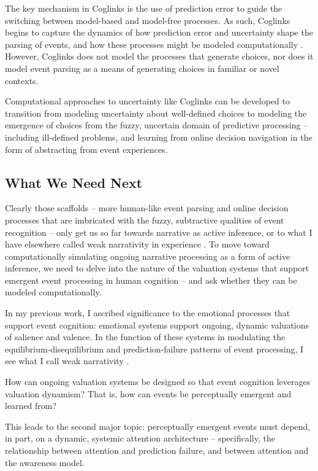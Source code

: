 \documentclass[11pt,a4paper]{article}
\begin{document}
The key mechanism in Coglinks is the use of prediction error to guide the switching between model-based and model-free processes. As such, Coglinks begins to capture the dynamics of how prediction error and uncertainty shape the parsing of events, and how these processes might be modeled computationally \citep{wang2025neural}. However, Coglinks does not model the processes that generate choices, nor does it model event parsing as a means of generating choices in familiar or novel contexts.

Computational approaches to uncertainty like Coglinks can be developed to transition from modeling uncertainty about well-defined choices to modeling the emergence of choices from the fuzzy, uncertain domain of predictive processing -- including ill-defined problems, and learning from online decision navigation in the form of abstracting from event experiences.

\subsection{What We Need Next}
Clearly those scaffolds -- more human-like event parsing and online decision processes that are imbricated with the fuzzy, subtractive qualities of event recognition -- only get us so far towards narrative as active inference, or to what I have elsewhere called weak narrativity in experience \citep{miller2023eventsweaknarrativity}. To move toward computationally simulating ongoing narrative processing as a form of active inference, we need to delve into the nature of the valuation systems that support emergent event processing in human cognition -- and ask whether they can be modeled computationally.

In my previous work, I ascribed significance to the emotional processes that support event cognition: emotional systems support ongoing, dynamic valuations of salience and valence. In the function of these systems in modulating the equilibrium-disequilibrium and prediction-failure patterns of event processing, I see what I call weak narrativity \citep{miller2023eventsweaknarrativity}.

How can ongoing valuation systems be designed so that event cognition leverages valuation dynamism? That is, how can events be perceptually emergent and learned from?

This leads to the second major topic: perceptually emergent events must depend, in part, on a dynamic, systemic attention architecture -- specifically, the relationship between attention and prediction failure, and between attention and the awareness model.
\end{document}
